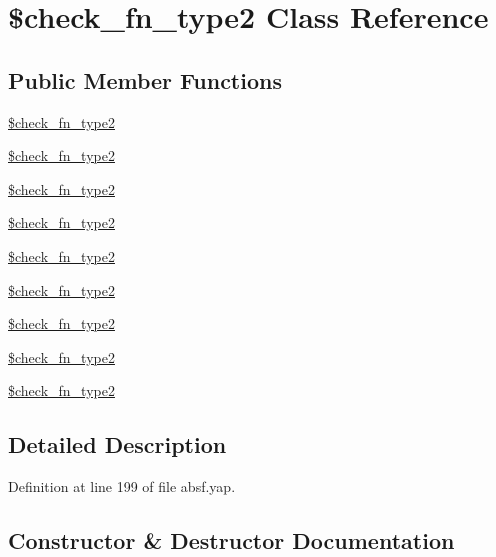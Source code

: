 \section{\$check\+\_\+fn\+\_\+type2 Class Reference}
\label{class_0Bcheck__fn__type2}
\subsection*{Public Member Functions}
\begin{DoxyCompactItemize}
\item 
\hyperlink{class_0Bcheck__fn__type2_a5446ff2771ab1faffc8f54fb59616b89}{\$check\+\_\+fn\+\_\+type2}
\item 
\hyperlink{class_0Bcheck__fn__type2_a5446ff2771ab1faffc8f54fb59616b89}{\$check\+\_\+fn\+\_\+type2}
\item 
\hyperlink{class_0Bcheck__fn__type2_a5446ff2771ab1faffc8f54fb59616b89}{\$check\+\_\+fn\+\_\+type2}
\item 
\hyperlink{class_0Bcheck__fn__type2_a5446ff2771ab1faffc8f54fb59616b89}{\$check\+\_\+fn\+\_\+type2}
\item 
\hyperlink{class_0Bcheck__fn__type2_a5446ff2771ab1faffc8f54fb59616b89}{\$check\+\_\+fn\+\_\+type2}
\item 
\hyperlink{class_0Bcheck__fn__type2_a5446ff2771ab1faffc8f54fb59616b89}{\$check\+\_\+fn\+\_\+type2}
\item 
\hyperlink{class_0Bcheck__fn__type2_a5446ff2771ab1faffc8f54fb59616b89}{\$check\+\_\+fn\+\_\+type2}
\item 
\hyperlink{class_0Bcheck__fn__type2_a5446ff2771ab1faffc8f54fb59616b89}{\$check\+\_\+fn\+\_\+type2}
\item 
\hyperlink{class_0Bcheck__fn__type2_a5446ff2771ab1faffc8f54fb59616b89}{\$check\+\_\+fn\+\_\+type2}
\end{DoxyCompactItemize}


\subsection{Detailed Description}


Definition at line 199 of file absf.\+yap.



\subsection{Constructor \& Destructor Documentation}
